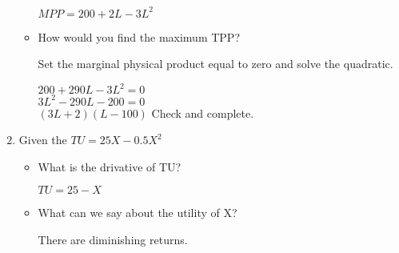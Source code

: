 \documentclass[12pt, a4paper, oneside]{article}\usepackage[]{graphicx}\usepackage[]{color}
\begin{document}
\begin{enumerate}
\begin{itemize}
$MPP = 200 +2L -3L^2$

\item How would you find the maximum TPP?

Set the marginal physical product equal to zero and solve the quadratic.

$200 + 290L -3L^2 = 0$\\
$3L^2 -290L - 200 = 0$\\
$(3L + 2)(L - 100)$
Check and complete. 

\end{itemize}


\item Given the $TU = 25X - 0.5X^2$
\begin{itemize}
\item What is the drivative of TU?

$TU = 25 - X$

\item What can we say about the utility of X?

There are diminishing returns. 

\end{itemize}



\end{enumerate}
\end{document}
